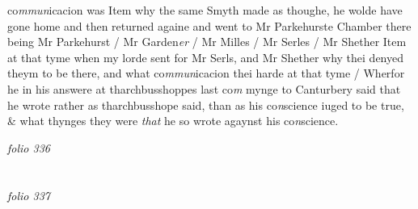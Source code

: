 \documentclass[12pt, a4paper]{book}
\begin{document}
			 co\textit{mmun}icacion was  
				\marginpar[\vspace{0.5cm}{\textcolor{Gray}{12}}]{}
			 Item why the same Smyth made as thoughe, he wolde have gone home and then returned againe and went to Mr Parkehurste Chamber there being Mr Parkehurst / Mr Garden\textit{er} / Mr Milles / Mr Serles / Mr  Shether  
				\marginpar[\vspace{0.5cm}{\textcolor{Gray}{13}}]{}
			 Item at that tyme when my lorde sent for Mr Serls, and Mr Shether why thei denyed theym to be there, and what co\textit{mmun}icacion thei harde at that tyme /  
				\marginpar[\vspace{0.5cm}{\textcolor{Gray}{14}}]{}
			 Wherfor he in his answere at tharchbusshoppes last co\textit{m} mynge to Canturbery said that he wrote rather as  tharchbusshope said, than as his co\textit{n}science iuged to be  true, \& what thynges they were \textit{that} he so wrote  agaynst his co\textit{n}science.

\dotfill
					

\textit{folio 336}


         \vspace{4cm}
         
\dotfill
					  \section*{}  \subsection*{}

\textit{folio 337}
\end{document}
